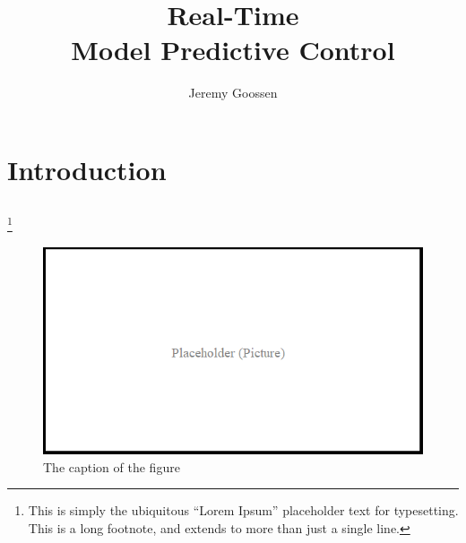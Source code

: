\documentclass[12pt, oneside]{report}
\title{Real-Time \\ Model Predictive Control}
\author{Jeremy Goossen}
\begin{document}
\frontmatter

\maketitle
\makesignatures
\makecopyright

\unpacklipsum[1-3]
\makeabstract{\lipsumexp}


\tableofcontents

\listoftables

\listoffigures





\mainmatter %

\chapter{Introduction}
\lipsum[1]
\section{\lipsum[150][1-3]}
\lipsum[3]%
\footnote{This is simply the ubiquitous ``Lorem Ipsum'' placeholder text for typesetting. This is a long footnote, and extends to more than just a single line.}

\begin{figure}[h]
  \centering
  \includegraphics[width=.7\textwidth]{figures/pictures/placeholder}
  \caption{The caption of the figure}
  \label{fig:BlockDiagram1}
\end{figure}
  
\end{document}
